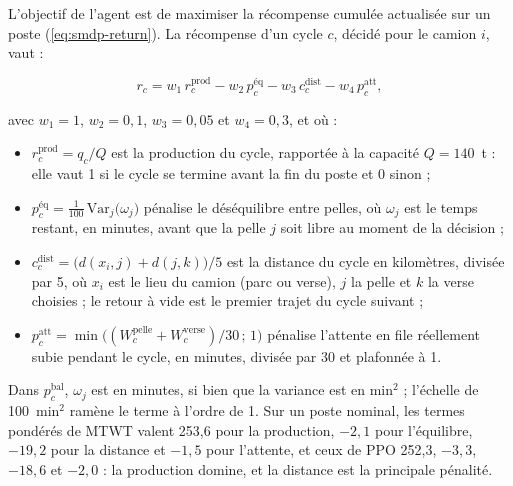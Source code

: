 \documentclass[11pt,a4paper]{article}
\newif\ifrevmarks
\newcommand{\revtag}[1]{\ifrevmarks\textsuperscript{\textcolor{red!70!black}{\scriptsize[#1]}}\fi}
\newenvironment{revbloc}[1]{\par\ifrevmarks\color{revcolor}\noindent\revtag{#1}\ \fi}{\par}
\newif\ifcorrmarks
\newcommand{\corr}[1]{\ifcorrmarks\textcolor{corrcolor}{#1}\else#1\fi}
\begin{document}
\begin{revbloc}{M10, M16, v3}
L'objectif de l'agent est de maximiser la récompense cumulée actualisée sur un poste (\cref{eq:smdp-return}). La récompense d'un cycle $c$, décidé pour le camion $i$, vaut :

\begin{equation}
r_c = w_1\, r^{\mathrm{prod}}_c - w_2\, p^{\mathrm{éq}}_c - w_3\, c^{\mathrm{dist}}_c - w_4\, p^{\mathrm{att}}_c ,
\label{eq:reward}
\end{equation}

avec $w_1 = 1$, $w_2 = 0{,}1$, $w_3 = 0{,}05$ et $w_4 = 0{,}3$, et où :

\begin{itemize}
  \item $r^{\mathrm{prod}}_c = q_c / Q$ est la production du cycle, rapportée à la capacité $Q = 140$~t : elle vaut 1 si le cycle se termine avant la fin du poste et 0 sinon ;
  \item $p^{\mathrm{éq}}_c = \frac{1}{100}\,\mathrm{Var}_j\big(\omega_j\big)$ pénalise le déséquilibre entre pelles, où $\omega_j$ est le temps restant, en minutes, avant que la pelle $j$ soit libre au moment de la décision ;
  \item $c^{\mathrm{dist}}_c = \big(d(x_i, j) + d(j, k)\big)/5$ est la distance du cycle en kilomètres, divisée par 5, où $x_i$ est le lieu du camion (parc ou verse), $j$ la pelle et $k$ la verse choisies ; le retour à vide est le premier trajet du cycle suivant ;
  \item $p^{\mathrm{att}}_c = \min\big((W^{\mathrm{pelle}}_c + W^{\mathrm{verse}}_c)/30\,;\,1\big)$ pénalise l'attente en file réellement subie pendant le cycle, en minutes, divisée par 30 et plafonnée à 1.
\end{itemize}

\corr{Dans $p^{\mathrm{bal}}_c$, $\omega_j$ est en minutes, si bien que la variance est en min$^2$ ; l'échelle de 100~min$^2$ ramène le terme à l'ordre de 1. Sur un poste nominal, les termes pondérés de MTWT valent 253,6 pour la production, $-2{,}1$ pour l'équilibre, $-19{,}2$ pour la distance et $-1{,}5$ pour l'attente, et ceux de PPO 252,3, $-3{,}3$, $-18{,}6$ et $-2{,}0$ : la production domine, et la distance est la principale pénalité.}


\end{revbloc}
\end{document}
